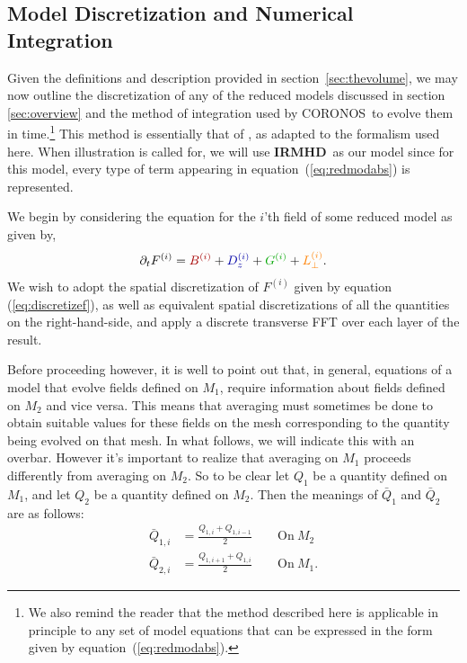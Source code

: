 \documentclass[12pt]{memoir}
\newcommand{\irmhd}{\textbf{IRMHD}}
\newcommand{\coronos}{\textsf{CORONOS}}
\begin{document}
\subsection{Model Discretization and Numerical Integration}
\label{sec:themethod}
%
Given the definitions and description provided in
section~\ref{sec:thevolume}, we may now outline the
discretization of any of the reduced models discussed in
section \ref{sec:overview} and the method of integration
used by \coronos\ to evolve them in time.\footnote{We also
remind the reader that the method described here is 
applicable in principle to any set of model equations that
can be expressed in the form given by 
equation~(\ref{eq:redmodabs}).} This method is essentially
that of \citep{Longcope93}, as adapted to the formalism
used here. When illustration is called for, we will use 
\irmhd\ as our model since for this model, every type of
term appearing in equation~(\ref{eq:redmodabs})
is represented.
%
\par
%
We begin by considering the equation for the $i$'th field
of some reduced model as given by,
%
\begin{equation}
  \pardt F^{(i)} = { \color{red!65!black}  B^{(i)}       }
                 + { \color{blue!65!black} D^{(i)}_z     }
                 + { \color{green!65!black}G^{(i)}       }
                 + { \color{orange}        L^{(i)}_\perp }.
\end{equation}
%
We wish to adopt the spatial discretization of $F^{(i)}$ given by
equation (\ref{eq:discretizef}), as well as equivalent spatial
discretizations of all the quantities on the right-hand-side,
and apply a discrete transverse FFT over each layer of the result.
%
\par
%
Before proceeding however, it is well to point out that, in general,
equations of a model that evolve fields defined on $M_1$, require
information about fields defined on $M_2$ and vice versa. This
means that averaging must sometimes be done to obtain suitable
values for these fields on the mesh corresponding to the quantity
being evolved on that mesh. In what follows, we will indicate this
with an overbar. However it's important to realize that averaging
on $M_1$ proceeds differently from averaging on $M_2$. So to be
clear let $Q_1$ be a quantity defined on $M_1$, and let $Q_2$ be
a quantity defined on $M_2$. Then the meanings of $\bar Q_1$
and $\bar Q_2$ are as follows:
%
\begin{align}
  \bar Q_{1,i} &= \frac{Q_{1,i  } + Q_{1,i-1}}{2}\qquad \mathrm{On\ } M_2 \\
  \bar Q_{2,i} &= \frac{Q_{1,i+1} + Q_{1,i  }}{2}\qquad \mathrm{On\ } M_1.
\end{align}
\end{document}
